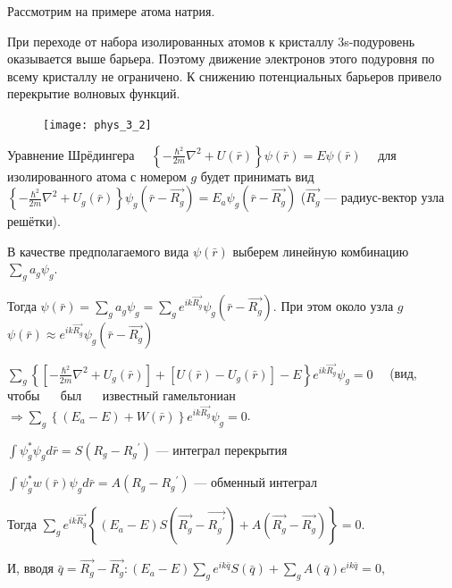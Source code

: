 Рассмотрим на примере атома натрия.

При переходе от набора изолированных атомов к кристаллу 3s-подуровень оказывается выше барьера. Поэтому движение электронов этого подуровня по всему кристаллу не ограничено. К снижению потенциальных барьеров привело перекрытие волновых функций.

\begin{figure}
    \texttt{[image: phys\_3\_2]}
\end{figure}

Уравнение Шрёдингера $\quad\left\{-\frac{\hbar^{2}}{2 m} \nabla^{2}+U(\bar{r})\right\} \psi(\bar{r})=E \psi(\bar{r}) \quad$ для изолированного атома с номером $g$ будет принимать вид $\left\{-\frac{\hbar^{2}}{2 m} \nabla^{2}+U_g(\bar{r})\right\} \psi_{g}\left(\bar{r}-\overrightarrow{R_{g}}\right)=E_{a} \psi_{g}\left(\bar{r}-\overrightarrow{R_{g}}\right)$ ($\overrightarrow{R_{g}}$ --- радиус-вектор узла решётки).

В качестве предполагаемого вида $\psi(\bar{r})$ выберем линейную комбинацию $\sum \limits_{g} a_{g} \psi_{g}$.

Тогда $\psi(\bar{r})=\sum \limits_{g} a_{g} \psi_{g}=\sum \limits_{g} e^{i k \overrightarrow{R_{g}}} \psi_{g}\left(\bar{r}-\overrightarrow{R_{g}}\right)$. При этом около узла $g$ $\psi(\bar{r}) \approx e^{i k \overrightarrow{R_{g}}} \psi_{g}\left(\bar{r}-\overrightarrow{R_{g}}\right)$

$\sum \limits_{g}\left\{\left[-\frac{\hbar^{2}}{2 m} \nabla^{2}+U_g(\bar{r})\right]+\left[U(\bar{r})-U_{g}(\bar{r})\right]-E\right\} e^{i k \overrightarrow{R_{g}}} \psi_{g}=0 \quad$ (вид, $\quad$ чтобы $\quad$ был $\quad$ известный гамельтониан $\Rightarrow \sum \limits_{g}\left\{\left(E_{a}-E\right)+W(\bar{r})\right\} e^{i k \overrightarrow{R_{g}}} \psi_{g}=0$.

$\displaystyle \int \psi_{g}^{*} \psi_{g} d \bar{r}=S\left(R_{g}-R_{g}{ }^{\prime}\right)$ --- интеграл перекрытия


$\displaystyle \int \psi_{g}^{*} w(\bar{r}) \psi_{g} d \bar{r}=A\left(R_{g}-R_{g}{ }^{\prime}\right)$ --- обменный интеграл 

Тогда $\displaystyle \sum \limits_{g} e^{i k \overrightarrow{R_{g}}}\left\{\left(E_{a}-E\right) S\left(\overrightarrow{R_{g}}-\overrightarrow{{R_{g}}^{\prime}}\right)+A\left(\overrightarrow{R_{g}}-\overrightarrow{R_{g}}\right)\right\}=0$.

И, вводя $\bar{q}=\overrightarrow{R_{g}}-\overrightarrow{R_{g}}:\left(E_{a}-E\right) \sum \limits_{g} e^{i k \bar{q}} S(\bar{q})+\sum \limits_{g} A(\bar{q}) e^{i k \bar{q}}=0$,

